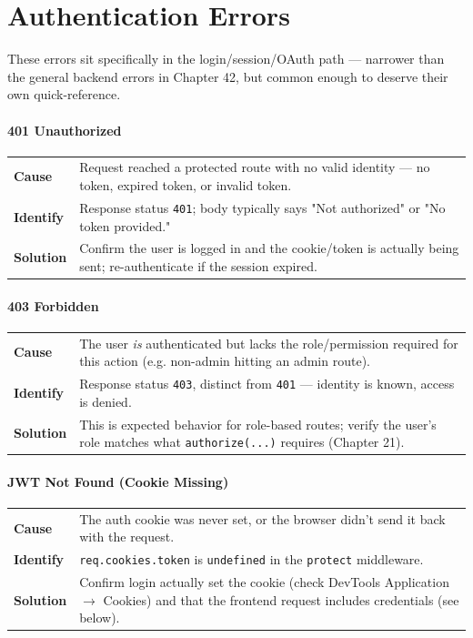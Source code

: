 \chapter{Authentication Errors}

\begin{notebox}[NOTE]
These errors sit specifically in the login/session/OAuth path --- narrower
than the general backend errors in Chapter 42, but common enough to
deserve their own quick-reference.
\end{notebox}

\subsubsection*{401 Unauthorized}
\noindent\begin{tabularx}{\textwidth}{@{}>{\bfseries}p{2.3cm}X@{}}
\toprule
Cause & Request reached a protected route with no valid identity --- no
token, expired token, or invalid token. \\
Identify & Response status \texttt{401}; body typically says "Not
authorized" or "No token provided." \\
Solution & Confirm the user is logged in and the cookie/token is actually
being sent; re-authenticate if the session expired. \\
\bottomrule
\end{tabularx}

\subsubsection*{403 Forbidden}
\noindent\begin{tabularx}{\textwidth}{@{}>{\bfseries}p{2.3cm}X@{}}
\toprule
Cause & The user \emph{is} authenticated but lacks the role/permission
required for this action (e.g. non-admin hitting an admin route). \\
Identify & Response status \texttt{403}, distinct from \texttt{401} ---
identity is known, access is denied. \\
Solution & This is expected behavior for role-based routes; verify the
user's role matches what \texttt{authorize(...)} requires (Chapter 21). \\
\bottomrule
\end{tabularx}

\subsubsection*{JWT Not Found (Cookie Missing)}
\noindent\begin{tabularx}{\textwidth}{@{}>{\bfseries}p{2.3cm}X@{}}
\toprule
Cause & The auth cookie was never set, or the browser didn't send it back
with the request. \\
Identify & \texttt{req.cookies.token} is \texttt{undefined} in the
\texttt{protect} middleware. \\
Solution & Confirm login actually set the cookie (check DevTools
Application $\to$ Cookies) and that the frontend request includes
credentials (see below). \\
\bottomrule
\end{tabularx}

